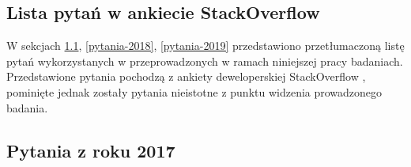 
\appendix
\begin{appendices}
    \chapter{Lista pytań w ankiecie StackOverflow}\label{app:dod1}

    W sekcjach \ref{pytania-2017}, \ref{pytania-2018}, \ref{pytania-2019} przedstawiono przetłumaczoną listę pytań wykorzystanych w przeprowadzonych w ramach niniejszej pracy badaniach.
    Przedstawione pytania pochodzą z ankiety deweloperskiej StackOverflow \cite{so-survey-info}, pominięte jednak zostały pytania nieistotne z punktu widzenia prowadzonego badania.


    \section{Pytania z roku 2017}\label{pytania-2017}



\end{appendices}
